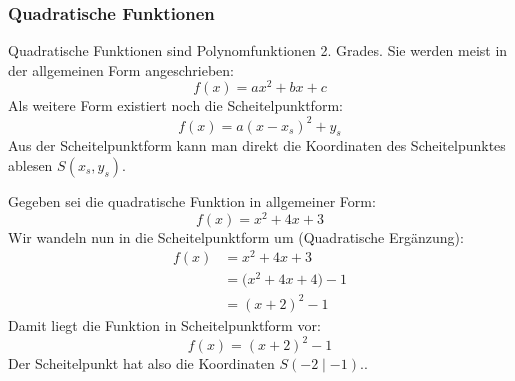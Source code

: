 \subsubsection*{Quadratische Funktionen}
Quadratische Funktionen sind Polynomfunktionen 2. Grades. Sie werden meist in der allgemeinen Form angeschrieben:
\begin{equation}
    f(x) = ax^2 + bx +c
\end{equation}
Als weitere Form existiert noch die Scheitelpunktform:
\begin{equation}
    f(x) = a (x-x_s)^2 + y_s
\end{equation}
Aus der Scheitelpunktform kann man direkt die Koordinaten des Scheitelpunktes ablesen $S(x_s,y_s)$.
\begin{bsp}
    Gegeben sei die quadratische Funktion in allgemeiner Form:  
    \[  
        f(x) = x^2 + 4x + 3  
    \]  
    Wir wandeln nun in die Scheitelpunktform um (Quadratische Ergänzung):  
    \begin{align*}  
    f(x) &= x^2 + 4x + 3 \\  
         &= \bigl(x^2 + 4x + 4\bigr) - 1 \\  
         &= (x + 2)^2 - 1  
    \end{align*}  
    Damit liegt die Funktion in Scheitelpunktform vor:  
    \[  
        \boxed{f(x) = (x + 2)^2 - 1}
    \]  
    Der Scheitelpunkt hat also die Koordinaten \(S(-2 \mid -1).\). 
    
    \begin{center}  
    \end{center}
\end{bsp}

